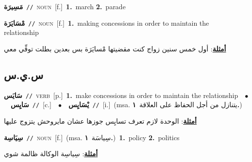 \documentclass[10pt,a4paper,twoside]{article} %
\begin{document}
\begin{multicols}{2}
{\setlength\topsep{0pt}\textbf{\foreignlanguage{arabic}{مَسِيرَة}}\ {\color{gray}\texttt{//}\color{black}}\ \textsc{noun}\ [f.]\ \textbf{1.}~march  \textbf{2.}~parade\ } \vspace{2mm}

{\setlength\topsep{0pt}\textbf{\foreignlanguage{arabic}{مْسَايَرَة}}\ {\color{gray}\texttt{//}\color{black}}\ \textsc{noun}\ [f.]\ \textbf{1.}~making concessions in order to maintain the relationship\  \begin{flushright}\color{gray}\foreignlanguage{arabic}{\textbf{\underline{\foreignlanguage{arabic}{أمثلة}}}: أول خمس سنين زواج كنت مقضيتها مْسايَرَة بس بعدين بطلت توفِّي معي}\end{flushright}\color{black}} \vspace{2mm}

\vspace{-3mm}
\subsection*{\color{blue}\foreignlanguage{arabic}{س.ي.س}\color{blue}{}} 

{\setlength\topsep{0pt}\textbf{\foreignlanguage{arabic}{سَايَس}}\ {\color{gray}\texttt{//}\color{black}}\ \textsc{verb}\ [p.]\ \textbf{1.}~make concessions in order to maintain the relationship\ \ $\bullet$\ \ \setlength\topsep{0pt}\textbf{\foreignlanguage{arabic}{سَايِس}}\ {\color{gray}\texttt{//}\color{black}}\ [c.]\ \ $\bullet$\ \ \setlength\topsep{0pt}\textbf{\foreignlanguage{arabic}{يْسَايِس}}\ {\color{gray}\texttt{//}\color{black}}\ [i.]\ \color{gray}(msa. \foreignlanguage{arabic}{يتنازل من أجل الحفاظ على العلاقة}~\foreignlanguage{arabic}{\textbf{١.}})\color{black}\  \begin{flushright}\color{gray}\foreignlanguage{arabic}{\textbf{\underline{\foreignlanguage{arabic}{أمثلة}}}: الوحدة لازم تعرف تسايِس جوزها عشان مايروحش يتزوج عليها}\end{flushright}\color{black}} \vspace{2mm}

{\setlength\topsep{0pt}\textbf{\foreignlanguage{arabic}{سِيَاسِة}}\ {\color{gray}\texttt{//}\color{black}}\ \textsc{noun}\ [f.]\ \color{gray}(msa. \foreignlanguage{arabic}{سِياسَة}~\foreignlanguage{arabic}{\textbf{١.}})\color{black}\ \textbf{1.}~policy  \textbf{2.}~politics\  \begin{flushright}\color{gray}\foreignlanguage{arabic}{\textbf{\underline{\foreignlanguage{arabic}{أمثلة}}}: سِياسِة الوكالة ظالمة شوي}\end{flushright}\color{black}} \vspace{2mm}


\end{multicols}
\end{document}
